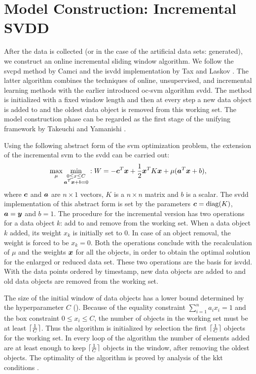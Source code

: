 \section{Model Construction: Incremental SVDD}\label{sec:method_model_construction}
After the data is collected (or in the case of the artificial data sets: generated), we construct an online incremental sliding window algorithm.
We follow the \gls{svcpd} method by Camci \cite{camci2010change} and the \gls{isvdd} implementation by Tax and Laskov \cite{tax2003online}.
The latter algorithm combines the techniques of online, unsupervised, and incremental learning methods with the earlier introduced \gls{oc-svm} algorithm \gls{svdd}.
The method is initialized with a fixed window length and then at every step a new data object is added to and the oldest data object is removed from this working set.
The model construction phase can be regarded as the first stage of the unifying framework by Takeuchi and Yamanishi \cite{takeuchi2006unifying}.

Using the following abstract form of the \gls{svm} optimization problem, the extension of the incremental \gls{svm} to the \gls{svdd} can be carried out:
\begin{equation}
  \operatorname*{max}_\mu \operatorname*{min}_{\substack{
    0 \le x \le C \\
    \vectorsym{a}^T \vectorsym{x} + b = 0}
  } : W = -\vectorsym{c}^T\vectorsym{x} + \frac{1}{2}\vectorsym{x}^T K\vectorsym{x} + \mu(\vectorsym{a}^T\vectorsym{x} + b),
\end{equation}
where $\vectorsym{c}$ and $\vectorsym{a}$ are $n \times 1$ vectors, $K$ is a $n \times n$ matrix and $b$ is a scalar.
The \gls{svdd} implementation of this abstract form is set by the parameters $\vectorsym{c}=\operatorname*{diag}(K)$, $\vectorsym{a} = \vectorsym{y}$ and $b=1$.
The procedure for the incremental version has two operations for a data object $k$: add to and remove from the working set.
When a data object $k$ added, its weight $x_k$ is initially set to $0$.
In case of an object removal, the weight is forced to be $x_k=0$.
Both the operations conclude with the recalculation  of $\mu$ and the weights $\vectorsym{x}$ for all the objects, in order to obtain the optimal solution for the enlarged or reduced data set.
These two operations are the basis for \gls{isvdd}.
With the data points ordered by timestamp, new data objects are added to and old data objects are removed from the working set.

The size of the initial window of data objects has a lower bound determined by the hyperparameter $C$ ().
Because of the equality constraint $\sum_{i=1}^n a_i x_i = 1$ and the box constraint $0 \le x_i \le C$, the number of objects in the working set must be at least $\lceil\frac{1}{C}\rceil$.
Thus the algorithm is initialized by selection the first $\lceil\frac{1}{C}\rceil$ objects for the working set.
In every loop of the algorithm the number of elements added are at least enough to keep $\lceil\frac{1}{C}\rceil$ objects in the window, after removing the oldest objects.
The optimality of the algorithm is proved by analysis of the \gls{kkt} conditions \cite{tax2003online}.

